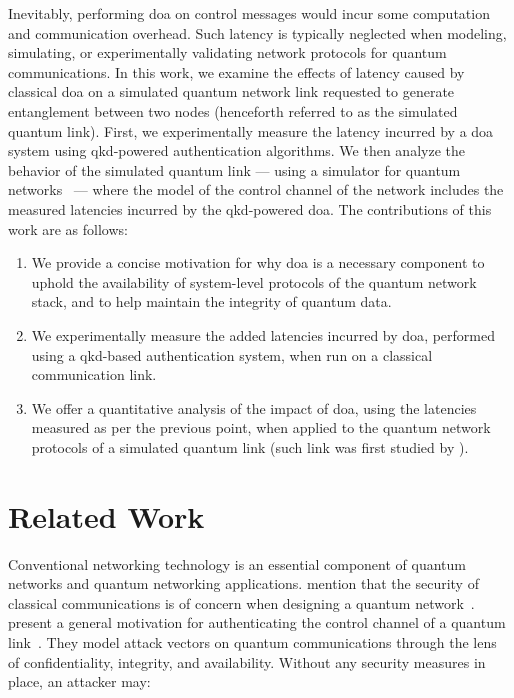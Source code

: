 Inevitably, performing \acrshort{doa} on control messages would incur some computation and
communication overhead. Such latency is typically neglected when modeling, simulating, or
experimentally validating network protocols for quantum communications. In this work, we examine the
effects of latency caused by classical \acrshort{doa} on a simulated quantum network link requested
to generate entanglement between two nodes (henceforth referred to as the simulated quantum link).
First, we experimentally measure the latency incurred by a \acrshort{doa} system using
\acrshort{qkd}-powered authentication algorithms. We then analyze the behavior of the simulated
quantum link --- using a simulator for quantum networks~\cite{coopmans_2021_netsquid} --- where the
model of the control channel of the network includes the measured latencies incurred by the
\acrshort{qkd}-powered \acrshort{doa}. The contributions of this work are as follows:

\begin{enumerate}
    \item We provide a concise motivation for why \acrshort{doa} is a necessary component to uphold
          the availability of system-level protocols of the quantum network stack, and to help
          maintain the integrity of quantum data.
    \item We experimentally measure the added latencies incurred by \acrshort{doa}, performed using
          a \acrshort{qkd}-based authentication system, when run on a classical communication link.
    \item We offer a quantitative analysis of the impact of \acrshort{doa}, using the latencies
          measured as per the previous point, when applied to the quantum network protocols of a
          simulated quantum link (such link was first studied by \textcite{dahlberg_2019_egp}).
\end{enumerate}

\section{Related Work}
\label{sec:doa:relwork}

Conventional networking technology is an essential component of quantum networks and quantum
networking applications. \citeauthor{kozlowski_2019_towards} mention that the security of classical
communications is of concern when designing a quantum network~\cite{kozlowski_2019_towards}.
\citeauthor{satoh_2020_attacking} present a general motivation for authenticating the control
channel of a quantum link~\cite{satoh_2020_attacking}. They model attack vectors on quantum
communications through the lens of confidentiality, integrity, and availability. Without any
security measures in place, an attacker may:

